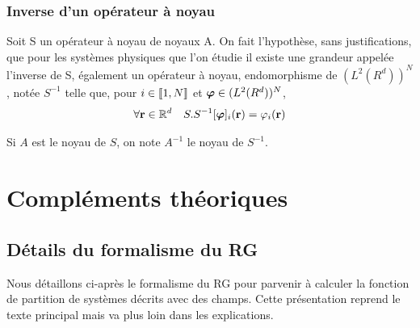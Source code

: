 \documentclass[10.5pt]{article}
\begin{document}
\begin{multicols}{2}
\subsubsection{Inverse d'un opérateur à noyau}

Soit S un opérateur à noyau de noyaux A. On fait l'hypothèse, sans justifications, que pour les systèmes physiques que l'on étudie il existe une grandeur appelée l'inverse de S, également un opérateur à noyau, endomorphisme de $(L^2(R^d))^N$, notée $S^{-1}$ telle que, pour $i \in  \llbracket 1,N \rrbracket $ et $\boldsymbol{ \varphi} \in (L^2(R^d))^N$, 
\begin{equation}
	\forall {\bf r} \in \mathbb{R}^d \quad S.S^{-1}[\boldsymbol{ \varphi}]_i({\bf r}) = \varphi_i ({\bf r})	
\end{equation}

Si $A$ est le noyau de $S$, on note $A^{-1}$ le noyau de $S^{-1}$. \\



\pagebreak


\section{Compléments théoriques}
\subsection{Détails du formalisme du RG}


Nous détaillons ci-après le formalisme du RG pour parvenir à calculer la fonction de partition de systèmes décrits avec des champs. Cette présentation reprend le texte principal mais va plus loin dans les explications.




\end{multicols}
\end{document}
